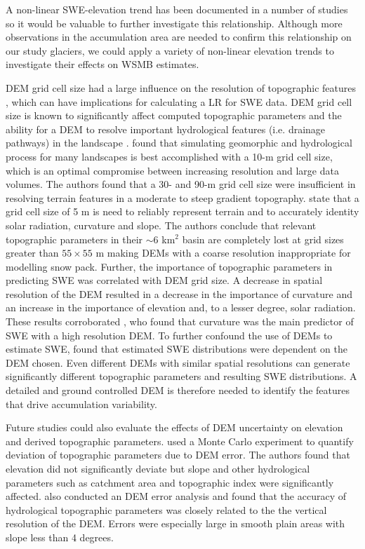 \documentclass[review,oneside, letterpaper]{igs}
\begin{document}
A non-linear SWE-elevation trend has been documented in a number of studies so it would be valuable to further investigate this relationship. Although more observations in the accumulation area are needed to confirm this relationship on our study glaciers, we could apply a variety of non-linear elevation trends to investigate their effects on WSMB estimates. 

DEM grid cell size had a large influence on the resolution of topographic features \citep{Lopez2010}, which can have implications for calculating a LR for SWE data. DEM grid cell size is known to significantly affect computed topographic parameters and the ability for a DEM to resolve important hydrological features (i.e. drainage pathways) in the landscape \citep{Zhang1994, Garbrecht1994, Guo-an2001}. \cite{Zhang1994} found that simulating geomorphic and hydrological process for many landscapes is best accomplished with a 10-m grid cell size, which is an optimal compromise between increasing resolution and large data volumes. The authors found that a 30- and 90-m grid cell size were insufficient in resolving terrain features in a  moderate to steep gradient topography. \cite{Lopez2010} state that a grid cell size of 5 m is need to reliably represent terrain and to accurately identity solar radiation, curvature and slope. The authors conclude that relevant topographic parameters in their $\sim$6 km$^2$ basin are completely lost at grid sizes greater than $55\times55$ m making DEMs with a coarse resolution inappropriate for modelling snow pack. Further, the importance of topographic parameters in predicting SWE was correlated with DEM grid size. A decrease in spatial resolution of the DEM resulted in a decrease in the importance of curvature and an increase in the importance of elevation and, to a lesser degree, solar radiation. These results corroborated \cite{Kienzle2004}, who found that curvature was the main predictor of SWE with a high resolution DEM. To further confound the use of DEMs to estimate SWE, \cite{Molotch2005} found that estimated SWE distributions were dependent on the DEM chosen. Even different DEMs with similar spatial resolutions can generate significantly different topographic parameters and resulting SWE distributions. A detailed and ground controlled DEM is therefore needed to identify the features that drive accumulation variability. 

Future studies could also evaluate the effects of DEM uncertainty on elevation and derived topographic parameters. \cite{Wechsler2006} used a Monte Carlo experiment to quantify deviation of topographic parameters due to DEM error. The authors found that elevation did not significantly deviate but slope and other hydrological parameters such as catchment area and topographic index were significantly affected. \cite{Guo-an2001} also conducted an DEM error analysis and found that the accuracy of hydrological topographic parameters was closely related to the the vertical resolution of the DEM. Errors were especially large in smooth plain areas with slope less than 4 degrees.
\end{document}
